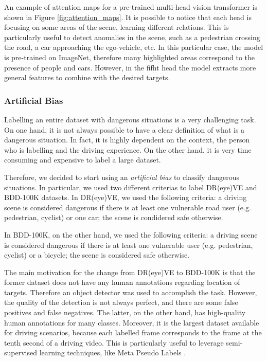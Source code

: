 An example of attention maps for a pre-trained multi-head vision transformer is 
shown in Figure \ref{fig:attention_maps}.
It is possible to notice that each head is focusing on some areas of the 
scene, learning different relations. This is particularly useful to detect 
anomalies in the scene, such as a pedestrian crossing the road, a car approaching 
the ego-vehicle, etc. In this particular case, the model is pre-trained on 
ImageNet, therefore many highlighted areas correspond to the presence of 
people and cars. However, in the fifht head the model extracts more general 
features to combine with the desired targets.

\subsubsection*{Artificial Bias}
Labelling an entire dataset with dangerous situations is a very challenging 
task. On one hand, it is not always possible to have a clear definition of what 
is a dangerous situation. In fact, it is highly dependent on the context, the 
person who is labelling and the driving experience. On the other hand, it is 
very time consuming and expensive to label a large dataset.

Therefore, we decided to start using an \emph{artificial bias} to classify 
dangerous situations. In particular, we used two different criterias to label 
DR(eye)VE and BDD-100K datasets. In DR(eye)VE, we used the following criteria:
a driving scene is considered dangerous if there is at least one vulnerable 
road user (e.g. pedestrian, cyclist) or one car; the scene is condidered safe 
otherwise.

In BDD-100K, on the other hand, we used the following criteria: a driving scene 
is considered dangerous if there is at least one vulnerable user (e.g. pedestrian, 
cyclist) or a bicycle; the scene is considered safe otherwise.

The main motivation for the change from DR(eye)VE to BDD-100K is that the former 
dataset does not have any human annotations regarding location of targets. 
Therefore an object detector was used to accomplish the task. However, the 
quality of the detection is not always perfect, and there are some false 
positives and false negatives.
The latter, on the other hand, has high-quality human annotations for many 
classes. Moreover, it is the largest dataset available for driving scenarios, 
because each labelled frame corresponds to the frame at the tenth second of 
a driving video. This is particularly useful to leverage semi-supervised learning 
techniques, like Meta Pseudo Labels \cite{pham2021meta}.

